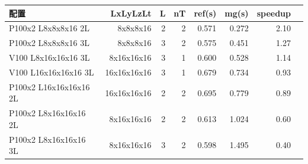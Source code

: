 \begin{tabular}{l|rrrrrrr}
\hline
配置 & LxLyLzLt & L & nT & ref(s) & mg(s) & speedup \\
\hline
P100x2 L8x8x8x16 2L & 8x8x8x16 & 2 & 2 & 0.571 & 0.272 & 2.10 \\
P100x2 L8x8x8x16 3L & 8x8x8x16 & 3 & 2 & 0.575 & 0.451 & 1.27 \\
V100 L8x16x16x16 3L & 8x16x16x16 & 3 & 1 & 0.600 & 0.528 & 1.14 \\
V100 L16x16x16x16 3L & 16x16x16x16 & 3 & 1 & 0.679 & 0.734 & 0.93 \\
P100x2 L16x16x16x16 2L & 16x16x16x16 & 2 & 2 & 0.695 & 0.779 & 0.89 \\
P100x2 L8x16x16x16 2L & 8x16x16x16 & 2 & 2 & 0.613 & 1.024 & 0.60 \\
P100x2 L8x16x16x16 3L & 8x16x16x16 & 3 & 2 & 0.598 & 1.495 & 0.40 \\
\hline
\end{tabular}
